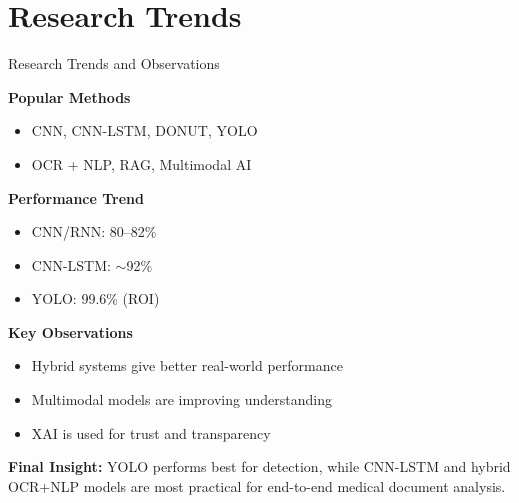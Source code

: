 \documentclass[11pt,aspectratio=169]{beamer}
\begin{document}
\section{Research Trends}
\begin{frame}{Research Trends and Observations}

\footnotesize

\textbf{Popular Methods}
\begin{itemize}
    \item CNN, CNN-LSTM, DONUT, YOLO
    \item OCR + NLP, RAG, Multimodal AI
\end{itemize}

\vspace{0.2cm}

\textbf{Performance Trend}
\begin{itemize}
    \item CNN/RNN: 80--82\%
    \item CNN-LSTM: $\sim$92\%
    \item YOLO: 99.6\% (ROI)
\end{itemize}

\vspace{0.2cm}

\textbf{Key Observations}
\begin{itemize}
    \item Hybrid systems give better real-world performance
    \item Multimodal models are improving understanding
    \item XAI is used for trust and transparency
\end{itemize}

\vspace{0.2cm}

\textbf{Final Insight:}
YOLO performs best for detection, while CNN-LSTM and hybrid OCR+NLP models are most practical for end-to-end medical document analysis.

\end{frame}
\end{document}
